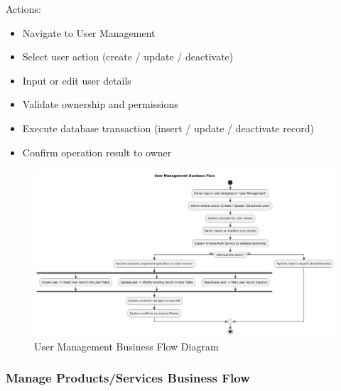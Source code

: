 \documentclass[]{VUMIFTemplateClass}
\begin{document}
Actions:
\begin{itemize}
\setlength{\itemsep}{2pt}
\setlength{\parskip}{0pt}
\setlength{\parsep}{0pt}
\item Navigate to User Management
\item Select user action (create / update / deactivate)
\item Input or edit user details
\item Validate ownership and permissions
\item Execute database transaction (insert / update / deactivate record)
\item Confirm operation result to owner
\end{itemize}

\begin{figure}[H]
    \centering
    \includegraphics[width=1\textwidth]{docs/ps-design/design-document/diagrams/business/bpmn_user_manage.png}
    \caption{User Management Business Flow Diagram}
    \label{fig:user_manage_flow}
\end{figure}

\subsubsection{Manage Products/Services Business Flow}
\end{document}
